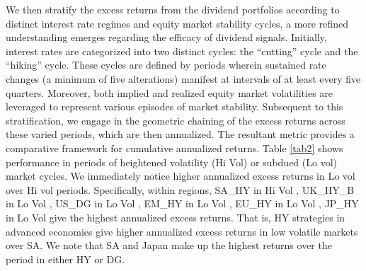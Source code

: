 \documentclass[12pt,preprint, authoryear]{elsarticle}
\numberwithin{equation}{section}
\numberwithin{figure}{section}
\numberwithin{table}{section}
\begin{document}
We then stratify the excess returns from the dividend portfolios
according to distinct interest rate regimes and equity market stability
cycles, a more refined understanding emerges regarding the efficacy of
dividend signals. Initially, interest rates are categorized into two
distinct cycles: the ``cutting'' cycle and the ``hiking'' cycle. These
cycles are defined by periods wherein sustained rate changes (a minimum
of five alterations) manifest at intervals of at least every five
quarters. Moreover, both implied and realized equity market volatilities
are leveraged to represent various episodes of market stability.
Subsequent to this stratification, we engage in the geometric chaining
of the excess returns across these varied periods, which are then
annualized. The resultant metric provides a comparative framework for
cumulative annualized returns. Table \ref{tab2} shows performance in
periods of heightened volatility (Hi Vol) or subdued (Lo vol) market
cycles. We immediately notice higher annualized excess returns in Lo vol
over Hi vol periods. Specifically, within regions, SA\_HY in Hi Vol ,
UK\_HY\_B in Lo Vol , US\_DG in Lo Vol , EM\_HY in Lo Vol , EU\_HY in Lo
Vol , JP\_HY in Lo Vol give the highest annualized excess returns. That
is, HY strategies in advanced economies give higher annualized excess
returns in low volatile markets over SA. We note that SA and Japan make
up the highest returns over the period in either HY or DG.
\end{document}

